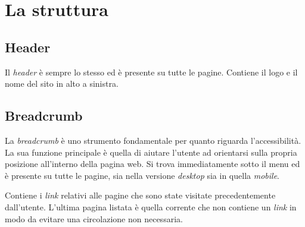 \section{La struttura}\label{sec:struttura}

\subsection{Header}
Il \textit{header} è sempre lo stesso ed è presente su tutte le pagine. Contiene il logo e il nome del sito in alto a sinistra.

\subsection{Breadcrumb}
La \textit{breadcrumb} è uno strumento fondamentale per quanto riguarda l’accessibilità. La sua funzione principale è quella di aiutare l'utente ad orientarsi sulla propria posizione all'interno della pagina web. Si trova immediatamente sotto il menu ed è presente su tutte le pagine, sia nella versione \textit{desktop} sia in quella \textit{mobile}.

Contiene i \textit{link} relativi alle pagine che sono state visitate precedentemente dall’utente. L'ultima pagina listata è quella corrente che non contiene un \textit{link} in modo da evitare una circolazione non necessaria.

